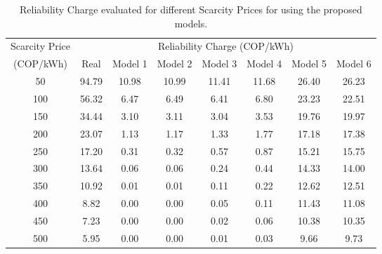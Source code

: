 \documentclass[3p]{elsarticle}
\begin{document}
\begin{table}[!h]
\centering
\begin{tabular}{c|ccccccc}
Scarcity Price & \multicolumn{7}{c}{Reliability Charge (COP/kWh)}                   \\
(COP/kWh)      & Real   & Model 1 & Model 2 & Model 3 & Model 4 & Model 5 & Model 6 \\ \hline
50             & 94.79 & 10.98   & 10.99   & 11.41   & 11.68   & 26.40   & 26.23   \\
100            & 56.32  & 6.47    & 6.49    & 6.41    & 6.80    & 23.23   & 22.51   \\
150            & 34.44  & 3.10    & 3.11    & 3.04    & 3.53    & 19.76   & 19.97   \\
200            & 23.07  & 1.13    & 1.17    & 1.33    & 1.77    & 17.18   & 17.38   \\
250            & 17.20  & 0.31    & 0.32    & 0.57    & 0.87    & 15.21   & 15.75   \\
300            & 13.64   & 0.06    & 0.06    & 0.24    & 0.44    & 14.33   & 14.00   \\
350            & 10.92   & 0.01    & 0.01    & 0.11    & 0.22    & 12.62   & 12.51   \\
400            & 8.82   & 0.00    & 0.00    & 0.05    & 0.11    & 11.43   & 11.08   \\
450            & 7.23   & 0.00    & 0.00    & 0.02    & 0.06    & 10.38   & 10.35   \\
500            & 5.95   & 0.00    & 0.00    & 0.01    & 0.03    & 9.66    & 9.73   
\end{tabular}
\caption{Reliability Charge evaluated for different Scarcity Prices for using the proposed models.}
\label{tab:ModComp}
\end{table}
\end{document}
